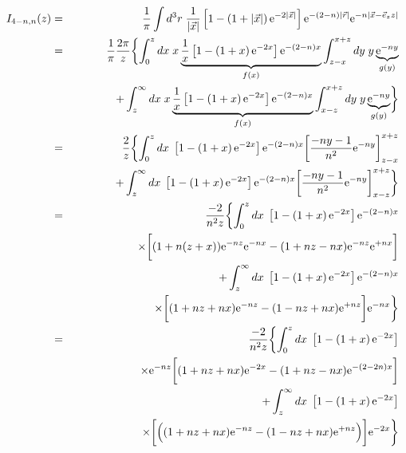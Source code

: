 \documentclass[11pt,a4paper]{report}
\begin{document}
\begin{eqnarray}
I_{4-n,n}(z)&=&\frac{1}{\pi}
\int d^3r\;\frac{1}{|\vec{x}|}
\left[1-\left(1+|\vec{x}|\right)\e{-2|\vec{x}|}\right]
\e{-(2-n)|\vec{r}|}\e{-n|\vec{x}-\vec{e}_z z|}
\nonumber\\
%
%
%
&=&\frac{1}{\pi}\frac{2\pi}{z}
\biggl\lbrace
\int_0^z dx\; x
\underbrace{
\frac{1}{x}\left[1-\left(1+x\right)\e{-2x}\right]\e{-(2-n)x}
}_{f(x)}
\int_{z-x}^{x+z}dy\; y\underbrace{\e{-ny}}_{g(y)}
\nonumber\\
&&+\int_z^\infty dx\; x
\underbrace{
\frac{1}{x}\left[1-\left(1+x\right)\e{-2x}\right]\e{-(2-n)x}
}_{f(x)}
\int_{x-z}^{x+z}dy\; y\underbrace{\e{-ny}}_{g(y)}
\biggr\rbrace
\nonumber\\
%
%
%
&=&\frac{2}{z}
\biggl\lbrace
\int_0^z dx\;
\left[1-\left(1+x\right)\e{-2x}\right]\e{-(2-n)x}
\biggl[\frac{-ny-1}{n^2}\e{-ny}\biggr]_{z-x}^{x+z}
\nonumber\\
&&+\int_z^\infty dx\; 
\left[1-\left(1+x\right)\e{-2x}\right]\e{-(2-n)x}
\biggl[\frac{-ny-1}{n^2}\e{-ny}\biggr]_{x-z}^{x+z}
\biggr\rbrace
\nonumber\\
%
%
%
&=&\frac{-2}{n^2z}
\biggl\lbrace
\int_0^z dx\;
\left[1-\left(1+x\right)\e{-2x}\right]\e{-(2-n)x}
\nonumber\\
&&\hspace{2cm}
\times\biggl[(1+n(z+x))\e{-nz}\e{-nx}
-(1+nz-nx)\e{-nz}\e{+nx}\biggr]
\nonumber\\
&&\hspace{0.5cm}+\int_z^\infty dx\; 
\left[1-\left(1+x\right)\e{-2x}\right]\e{-(2-n)x}
\nonumber\\
&&\hspace{2cm}
\times\biggl[(1+nz+nx)\e{-nz}
-(1-nz+nx)\e{+nz}
\biggr]\e{-nx}
\biggr\rbrace
\nonumber\\
%
%
%
&=&\frac{-2}{n^2z}
\biggl\lbrace
\int_0^z dx\;
\left[1-\left(1+x\right)\e{-2x}\right]
\nonumber\\
&&\hspace{2cm}
\times\e{-nz}\biggl[(1+nz+nx)\e{-2x}-(1+nz-nx)\e{-(2-2n)x}\biggr]
\nonumber\\
&&\hspace{0.5cm}+\int_z^\infty dx\; 
\left[1-\left(1+x\right)\e{-2x}\right]
\nonumber\\
&&\hspace{2cm}
\times\biggl[
\Bigl((1+nz+nx)\e{-nz}-(1-nz+nx)\e{+nz}\Bigr)
\biggr]\e{-2x}
\biggr\rbrace
\nonumber\\
\end{eqnarray}
\end{document}
